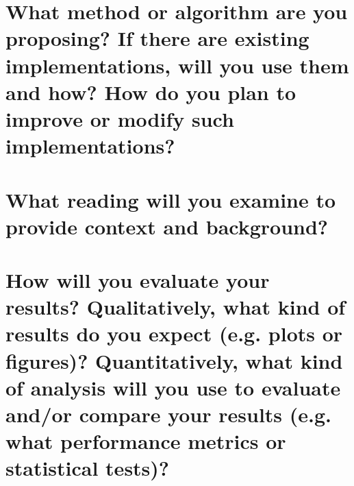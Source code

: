 \section{What method or algorithm are you proposing? If there are existing implementations, will you use them and how? How do you plan to improve or modify such implementations?}

\section{What reading will you examine to provide context and background?}

\section{How will you evaluate your results? Qualitatively, what kind of results do you expect (e.g. plots or figures)? Quantitatively, what kind of analysis will you use to evaluate and/or compare your results (e.g. what performance metrics or statistical tests)?}

\printbibliography


